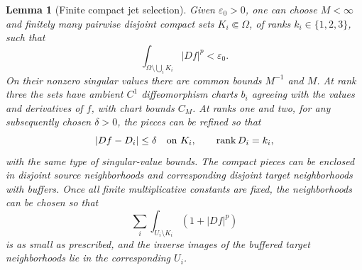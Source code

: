 \documentclass[11pt]{article}
\numberwithin{equation}{section}
\newtheorem{lemma}[theorem]{Lemma}
\theoremstyle{definition}
\theoremstyle{remark}
\DeclareMathOperator{\rank}{rank}
\begin{document}
\begin{lemma}[Finite compact jet selection]\label{la:jet-selection}
Given $\varepsilon_0>0$, one can choose $M<\infty$ and finitely many
pairwise disjoint compact sets $K_i\Subset\Omega$, of ranks
$k_i\in\{1,2,3\}$, such that
\begin{equation}\label{la:jet-tail}
 \int_{\Omega\setminus\bigcup_iK_i}|Df|^p<\varepsilon_0.
\end{equation}
On their nonzero singular values there are common bounds $M^{-1}$
and $M$.  At rank three the sets have ambient $C^1$ diffeomorphism
charts $b_i$ agreeing with the values and derivatives of $f$, with
chart bounds $C_M$.  At ranks one and two, for any subsequently chosen
$\delta>0$, the pieces can be refined so that
\begin{equation}\label{la:rank-model}
 |Df-D_i|\le\delta\quad\hbox{on }K_i,
 \qquad \rank D_i=k_i,
\end{equation}
with the same type of singular-value bounds.  The compact pieces can
be enclosed in disjoint source neighborhoods and corresponding
disjoint target neighborhoods with buffers.  Once all finite
multiplicative constants are fixed, the neighborhoods can be chosen
so that
\begin{equation}\label{la:excess-neighborhood}
 \sum_i\int_{U_i\setminus K_i}(1+|Df|^p)
\end{equation}
is as small as prescribed, and the inverse images of the buffered
target neighborhoods lie in the corresponding $U_i$.
\end{lemma}
\end{document}

